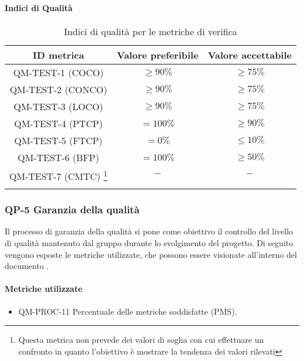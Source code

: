 		\paragraph{Indici di Qualità}
			\begin{center}
				\begin{longtable}{|c|c|c|}
				\hline
				\rowcolor{lighter-grayer}
				\textbf{ID metrica} & \textbf{Valore preferibile} & \textbf{Valore accettabile}\\
				\hline
				\endfirsthead
				\hline
				QM-TEST-1 (COCO) & \(\geq 90\%\) & \(\geq 75\%\) \\ \hline
				QM-TEST-2 (CONCO) & \(\geq 90\%\) & \(\geq 75\%\) \\ \hline
				QM-TEST-3 (LOCO) & \(\geq 90\%\) & \(\geq 75\%\) \\ \hline
				QM-TEST-4 (PTCP) & \(= 100\%\) & \(\geq 90\%\) \\ \hline
				QM-TEST-5 (FTCP) & \(= 0\%\) & \(\le 10\%\) \\ \hline
				QM-TEST-6 (BFP) & \(= 100\%\) & \(\geq 50\%\) \\ \hline
				QM-TEST-7 (CMTC) \footnote{Questa metrica non prevede dei valori di soglia con cui effettuare un confronto in quanto l'obiettivo è mostrare la tendenza dei valori rilevati} & \(-\) & \(-\) \\ \hline
				\hline
				\caption{Indici di qualità per le metriche di verifica}
				\end{longtable}
			\end{center}
	\newpage
	\subsubsection{QP-5 Garanzia della qualità}
	
	Il processo di garanzia della qualità si pone come obiettivo il controllo del livello di qualità mantenuto dal gruppo durante lo svolgimento del progetto.
	\newline
	Di seguito vengono esposte le metriche utilizzate, che possono essere visionate all'interno del documento .
	
	\paragraph{Metriche utilizzate}
	
	\begin{itemize}
		\item QM-PROC-11 Percentuale delle metriche soddisfatte (PMS).
	\end{itemize}
	
